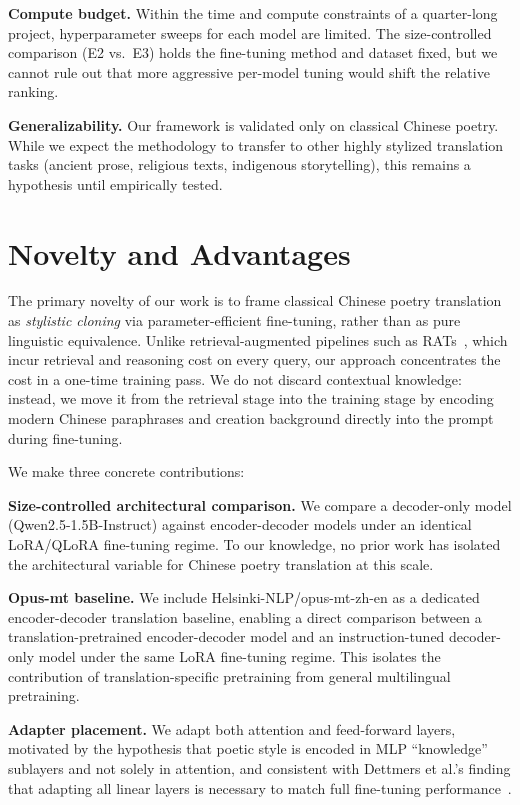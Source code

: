 \textbf{Compute budget.} Within the time and compute constraints of a quarter-long project, hyperparameter sweeps for each model are limited. The size-controlled comparison (E2 vs.\ E3) holds the fine-tuning method and dataset fixed, but we cannot rule out that more aggressive per-model tuning would shift the relative ranking.

\textbf{Generalizability.} Our framework is validated only on classical Chinese poetry. While we expect the methodology to transfer to other highly stylized translation tasks (ancient prose, religious texts, indigenous storytelling), this remains a hypothesis until empirically tested.

\section{Novelty and Advantages}
The primary novelty of our work is to frame classical Chinese poetry
translation as \emph{stylistic cloning} via parameter-efficient fine-tuning,
rather than as pure linguistic equivalence. Unlike retrieval-augmented
pipelines such as RATs~\cite{chen2025benchmarking}, which incur retrieval
and reasoning cost on every query, our approach concentrates the cost in a
one-time training pass. We do not discard contextual knowledge: instead, we move it
from the retrieval stage into the training stage by encoding modern Chinese paraphrases and creation background directly into the prompt during fine-tuning.

We make three concrete contributions:

\textbf{Size-controlled architectural comparison.} We compare a decoder-only
model (Qwen2.5-1.5B-Instruct) against encoder-decoder models under an identical
LoRA/QLoRA fine-tuning regime. To our knowledge, no prior work has isolated
the architectural variable for Chinese poetry translation at this scale.

\textbf{Opus-mt baseline.} We include Helsinki-NLP/opus-mt-zh-en as a dedicated encoder-decoder translation baseline, enabling a direct comparison between a translation-pretrained encoder-decoder model and an instruction-tuned decoder-only model under the same LoRA fine-tuning regime. This isolates the contribution of translation-specific pretraining from general multilingual pretraining.

\textbf{Adapter placement.} We adapt both attention and feed-forward layers,
motivated by the hypothesis that poetic style is encoded in MLP
``knowledge'' sublayers and not solely in attention, and consistent with
Dettmers et al.'s finding that adapting all linear layers is necessary to
match full fine-tuning performance~\cite{dettmers2023qlora}.


